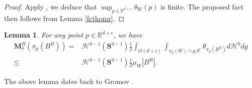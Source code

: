 \documentclass[11pt,a4paper]{amsart}
\numberwithin{equation}{section}
\newcommand{\de}{\delta}
\newcommand{\hm}{\mathcal{H}}
\newcommand{\ms}{\mathbf{M}}
\newcommand{\R}{\mathbb{R}}
\theoremstyle{plain}
\newtheorem{lem}{Lemma}[subsection]
\theoremstyle{definition}
\numberwithin{equation}{subsection}
\begin{document}
\begin{proof}
	Apply \cite[Proposition 3.0.6]{GVvwl}, we deduce that $\sup_{p\in\R^{d+c}}\theta_W(p)$ is finite. The proposed fact then follows from Lemma \ref{fcthomr}.
\end{proof}	
\begin{lem}
	For any point $p\in \R^{d+c}$, we have 
	\begin{align}
		\label{eqmsr1}		\ms^R_\de\left(\pi_p\left( B^R\right)\right)=&\hm^{d-1}(\mathbf{S}^{d-1})\frac{1}{2}\int_{O(d+c)}\int_{\pi_p(W)\cap g.S^c}\theta_{\pi_p\left( B^R\right)}d\mathcal{H}^0 dg\\\le& \hm^{d-1}(\mathbf{S}^{d-1})\frac{1}{2}\mu_W\left|B^R\right|.\label{eqmsr2}
	\end{align}
\end{lem}	
The above lemma dates back to Gromov \cite[Section 8.1 Example (2)]{MGfrm}.
\end{document}
